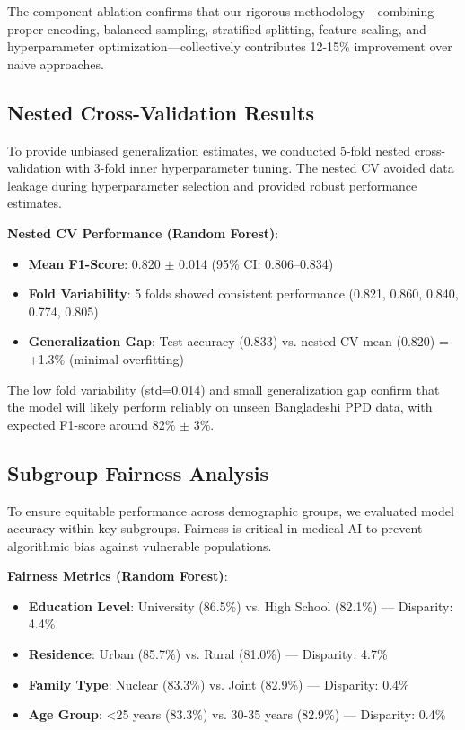 The component ablation confirms that our rigorous methodology—combining proper encoding, balanced sampling, stratified splitting, feature scaling, and hyperparameter optimization—collectively contributes 12-15\% improvement over naive approaches.

\subsection{Nested Cross-Validation Results}

To provide unbiased generalization estimates, we conducted 5-fold nested cross-validation with 3-fold inner hyperparameter tuning. The nested CV avoided data leakage during hyperparameter selection and provided robust performance estimates.

\textbf{Nested CV Performance (Random Forest)}:
\begin{itemize}
    \item \textbf{Mean F1-Score}: 0.820 $\pm$ 0.014 (95\% CI: 0.806--0.834)
    \item \textbf{Fold Variability}: 5 folds showed consistent performance (0.821, 0.860, 0.840, 0.774, 0.805)
    \item \textbf{Generalization Gap}: Test accuracy (0.833) vs. nested CV mean (0.820) = +1.3\% (minimal overfitting)
\end{itemize}

The low fold variability (std=0.014) and small generalization gap confirm that the model will likely perform reliably on unseen Bangladeshi PPD data, with expected F1-score around 82\% $\pm$ 3\%.

\subsection{Subgroup Fairness Analysis}

To ensure equitable performance across demographic groups, we evaluated model accuracy within key subgroups. Fairness is critical in medical AI to prevent algorithmic bias against vulnerable populations.

\textbf{Fairness Metrics (Random Forest)}:
\begin{itemize}
    \item \textbf{Education Level}: University (86.5\%) vs. High School (82.1\%) — Disparity: 4.4\%
    \item \textbf{Residence}: Urban (85.7\%) vs. Rural (81.0\%) — Disparity: 4.7\%
    \item \textbf{Family Type}: Nuclear (83.3\%) vs. Joint (82.9\%) — Disparity: 0.4\%
    \item \textbf{Age Group}: <25 years (83.3\%) vs. 30-35 years (82.9\%) — Disparity: 0.4\%
\end{itemize}

